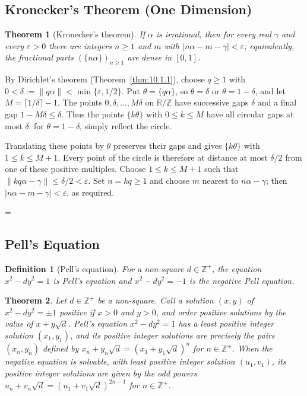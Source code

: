 \documentclass[11pt]{article}
\makeatletter
\theoremstyle{ntstyle}
\newtheorem{theorem}{Theorem}[subsection]
\newtheorem{definition}{Definition}[subsection]
\let\nt@closedisplay\]
\def\nt@guardedclose{\@ifnextchar\par{\nt@closeafterpar}{\@ifnextchar\end{\postdisplaypenalty\@M\nt@closedisplay}{\nt@closedisplay}}}
\def\nt@closeafterpar\par{\@ifnextchar\par{\nt@closeafterpar}{\@ifnextchar\end{\postdisplaypenalty\@M\nt@closedisplay\par}{\nt@closedisplay\par}}}
\renewenvironment{proof}[1][\proofname]{\par
  \pushQED{\qed}\normalfont\topsep\medskipamount\edef\nt@afterproof{\@endparpenalty=\the\@endparpenalty\relax}\@beginparpenalty\@M\@endparpenalty\@M\let\]\nt@guardedclose\trivlist\item[]\textit{#1\@addpunct{.}} \ignorespaces}{\ifvmode\addpenalty\@M\fi\popQED\nt@afterproof\endtrivlist\@endpefalse}
\makeatother
\begin{document}
\subsection{Kronecker's Theorem (One Dimension)}

\begin{theorem}[Kronecker's theorem]\label{thm:10.6.1} If $\alpha$ is
	irrational, then for every real $\gamma$ and every $\varepsilon>0$
	there are integers $n\ge1$ and $m$ with
	$|n\alpha-m-\gamma|<\varepsilon$; equivalently, the fractional parts
	$(\{n\alpha\})_{n\ge1}$ are dense in $[0,1]$.

\end{theorem}

\begin{proof} By Dirichlet's theorem (Theorem~\ref{thm:10.1.1}),
	choose $q\ge1$ with $0<\delta:=\lVert q\alpha\rVert<\min\{\varepsilon,1/2\}$.
	Put $\theta=\{q\alpha\}$, so $\theta=\delta$ or $\theta=1-\delta$,
	and let $M=\lceil1/\delta\rceil-1$.
	The points $0,\delta,\ldots,M\delta$ on $\mathbb{R}/\mathbb{Z}$
	have successive gaps $\delta$ and a final gap $1-M\delta\le\delta$.
	Thus the points $\{k\theta\}$ with $0\le k\le M$ have all circular gaps
	at most $\delta$: for $\theta=1-\delta$, simply reflect the circle.

	Translating these points by $\theta$ preserves their gaps and gives
	$\{k\theta\}$ with $1\le k\le M+1$. Every point of the circle is
	therefore at distance at most $\delta/2$ from one of these positive
	multiples. Choose $1\le k\le M+1$ such that
	$\lVert kq\alpha-\gamma\rVert\le\delta/2<\varepsilon$.
	Set $n=kq\ge1$ and choose $m$ nearest to $n\alpha-\gamma$; then
	$|n\alpha-m-\gamma|<\varepsilon$, as required.

\end{proof}
\subsection{Pell's Equation}

\begin{definition}[Pell's equation]\label{def:10.7.1} For a non-square
	$d\in\mathbb{Z}^+$, the equation $x^2-dy^2=1$ is Pell's equation and $x^2-dy^2=-1$
	is the negative Pell equation.

\end{definition}
\begin{theorem}\label{thm:10.7.1} Let $d\in\mathbb{Z}^+$ be a non-square.
	Call a solution $(x,y)$ of $x^2-dy^2=\pm1$ positive if $x>0$ and $y>0$, and
	order positive solutions by the value of $x+y\sqrt{d}$.
	Pell's equation $x^2-dy^2=1$ has a least positive integer solution $(x_1,y_1)$,
	and its positive integer solutions are precisely the pairs $(x_n,y_n)$
	defined by
	$x_n+y_n\sqrt{d}=(x_1+y_1\sqrt{d})^{n}$ for $n\in\mathbb{Z}^+$.
	When the negative equation is solvable,
	with least positive integer solution $(u_1,v_1)$, its positive integer
	solutions are given by the odd powers $u_n+v_n\sqrt
		{d}=(u_1+v_1\sqrt{d})^{2n-1}$ for $n\in\mathbb{Z}^+$.

\end{theorem}
\end{document}
